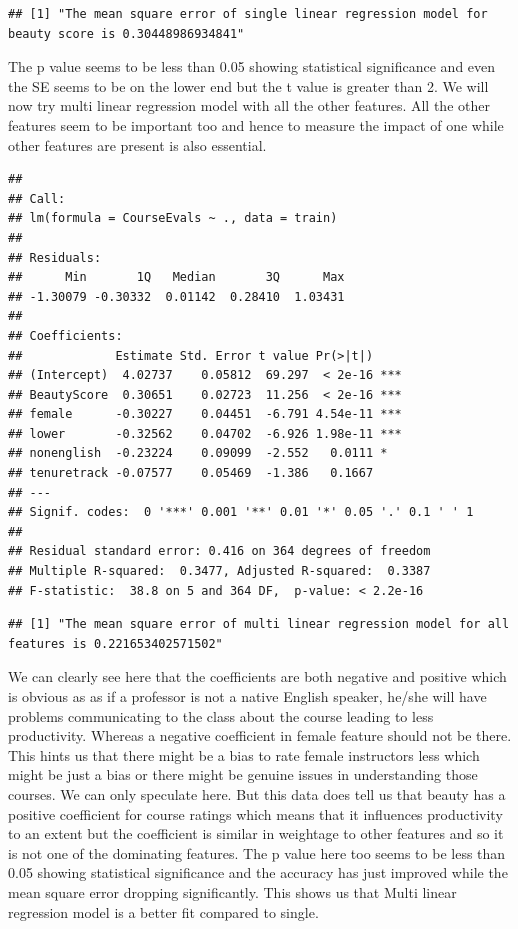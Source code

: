 \documentclass[
]{article}
\begin{document}
\begin{verbatim}
## [1] "The mean square error of single linear regression model for beauty score is 0.30448986934841"
\end{verbatim}

The p value seems to be less than 0.05 showing statistical significance
and even the SE seems to be on the lower end but the t value is greater
than 2. We will now try multi linear regression model with all the other
features. All the other features seem to be important too and hence to
measure the impact of one while other features are present is also
essential.

\begin{verbatim}
## 
## Call:
## lm(formula = CourseEvals ~ ., data = train)
## 
## Residuals:
##      Min       1Q   Median       3Q      Max 
## -1.30079 -0.30332  0.01142  0.28410  1.03431 
## 
## Coefficients:
##             Estimate Std. Error t value Pr(>|t|)    
## (Intercept)  4.02737    0.05812  69.297  < 2e-16 ***
## BeautyScore  0.30651    0.02723  11.256  < 2e-16 ***
## female      -0.30227    0.04451  -6.791 4.54e-11 ***
## lower       -0.32562    0.04702  -6.926 1.98e-11 ***
## nonenglish  -0.23224    0.09099  -2.552   0.0111 *  
## tenuretrack -0.07577    0.05469  -1.386   0.1667    
## ---
## Signif. codes:  0 '***' 0.001 '**' 0.01 '*' 0.05 '.' 0.1 ' ' 1
## 
## Residual standard error: 0.416 on 364 degrees of freedom
## Multiple R-squared:  0.3477, Adjusted R-squared:  0.3387 
## F-statistic:  38.8 on 5 and 364 DF,  p-value: < 2.2e-16
\end{verbatim}

\begin{verbatim}
## [1] "The mean square error of multi linear regression model for all features is 0.221653402571502"
\end{verbatim}

We can clearly see here that the coefficients are both negative and
positive which is obvious as as if a professor is not a native English
speaker, he/she will have problems communicating to the class about the
course leading to less productivity. Whereas a negative coefficient in
female feature should not be there. This hints us that there might be a
bias to rate female instructors less which might be just a bias or there
might be genuine issues in understanding those courses. We can only
speculate here. But this data does tell us that beauty has a positive
coefficient for course ratings which means that it influences
productivity to an extent but the coefficient is similar in weightage to
other features and so it is not one of the dominating features. The p
value here too seems to be less than 0.05 showing statistical
significance and the accuracy has just improved while the mean square
error dropping significantly. This shows us that Multi linear regression
model is a better fit compared to single.
\end{document}

